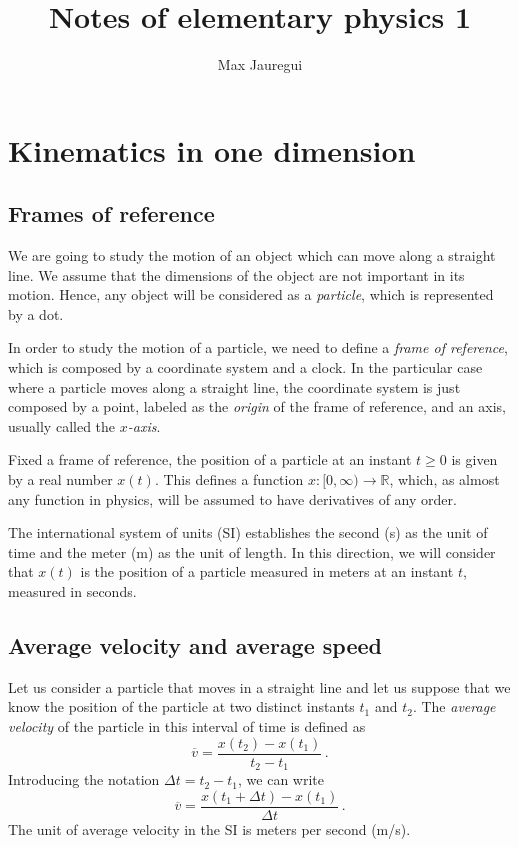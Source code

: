 \documentclass[12pt,a4paper]{article}
\title{Notes of elementary physics 1}
\author{Max Jauregui}
\newcommand{\R}{\mathbb{R}}
\theoremstyle{definition}
\begin{document}
\maketitle
\section{Kinematics in one dimension}

\subsection{Frames of reference}

We are going to study the motion of an object which can move along a
straight line. We assume that the dimensions of the object are not
important in its motion. Hence, any object will be considered as a
\emph{particle}, which is represented by a dot.

In order to study the motion of a particle, we need to define a
\emph{frame of reference}, which is composed by a coordinate system
and a clock. In the particular case where a particle moves along a
straight line, the coordinate system is just composed by a point,
labeled as the \emph{origin} of the frame of reference, and an axis,
usually called the \emph{$x$-axis}.

Fixed a frame of reference, the position of a particle at an instant
$t\ge 0$ is given by a real number $x(t)$. This defines a function
$x:[0,\infty)\to\R$, which, as almost any function in physics, will be
assumed to have derivatives of any order.

The international system of units (SI) establishes the second (s) as
the unit of time and the meter (m) as the unit of length. In this
direction, we will consider that $x(t)$ is the position of a particle
measured in meters at an instant $t$, measured in seconds.

\subsection{Average velocity and average speed}

Let us consider a particle that moves in a straight line and let us
suppose that we know the position of the particle at two distinct
instants $t_1$ and $t_2$. The \emph{average velocity} of the particle
in this interval of time is defined as
$$\overline v=\frac{x(t_2)-x(t_1)}{t_2-t_1}\,.$$
Introducing the notation $\Delta t=t_2-t_1$, we can write
$$\overline{v}=\frac{x(t_1+\Delta t)-x(t_1)}{\Delta t}\,.$$
The unit of average velocity in the SI is meters per second (m/s).
\end{document}
